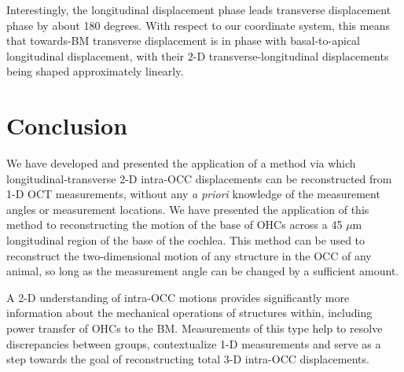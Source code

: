\documentclass[aip,cp,amsmath,amssymb,reprint]{revtex4-2}
\begin{document}
\par{Interestingly, the longitudinal displacement phase leads transverse displacement phase by about 180 degrees. With respect to our coordinate system, this means that towards-BM transverse displacement is in phase with basal-to-apical longitudinal displacement, with their 2-D transverse-longitudinal displacements being shaped approximately linearly.}

\section{\label{sec:conclusion}Conclusion}

\par{We have developed and presented the application of a method via which longitudinal-transverse 2-D intra-OCC displacements can be reconstructed from 1-D OCT measurements, without any \textit{a priori} knowledge of the measurement angles or measurement locations. We have presented the application of this method to reconstructing the motion of the base of OHCs across a 45 $\mu$m longitudinal region of the base of the cochlea. This method can be used to reconstruct the two-dimensional motion of any structure in the OCC of any animal, so long as the measurement angle can be changed by a sufficient amount.}
\par{A 2-D understanding of intra-OCC motions provides significantly more information about the mechanical operations of structures within, including power transfer of OHCs to the BM. Measurements of this type help to resolve discrepancies between groups, contextualize 1-D measurements and serve as a step towards the goal of reconstructing total 3-D intra-OCC displacements.}


\end{document}
